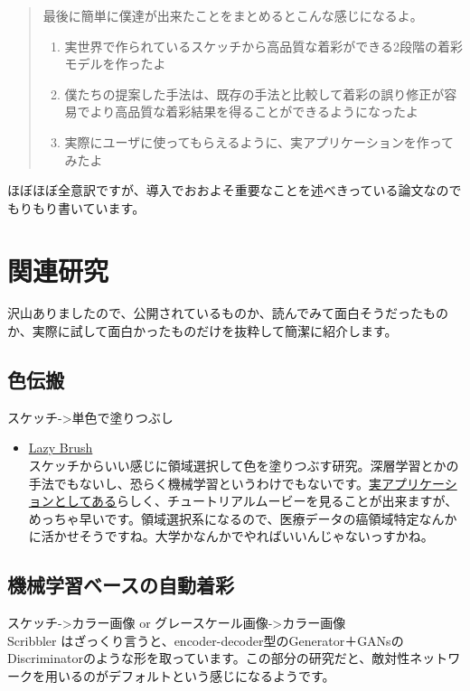 \documentclass[a4paper, dvipdfmx, 10pt]{article}
\begin{document}
\begin{quote}
最後に簡単に僕達が出来たことをまとめるとこんな感じになるよ。\\

\begin{enumerate}
\item 実世界で作られているスケッチから高品質な着彩ができる2段階の着彩モデルを作ったよ\\
\item 僕たちの提案した手法は、既存の手法と比較して着彩の誤り修正が容易でより高品質な着彩結果を得ることができるようになったよ\\
\item 実際にユーザに使ってもらえるように、実アプリケーションを作ってみたよ\\
\end{enumerate}
\end{quote}

ほぼほぼ全意訳ですが、導入でおおよそ重要なことを述べきっている論文なのでもりもり書いています。\\


\section{関連研究}
\label{sec:org2fced56}
沢山ありましたので、公開されているものか、読んでみて面白そうだったものか、実際に試して面白かったものだけを抜粋して簡潔に紹介します。\\

\subsection{色伝搬}
\label{sec:orgf5794f8}
スケッチ->単色で塗りつぶし\\

\begin{itemize}
\item \href{https://dcgi.fel.cvut.cz/home/sykorad/Sykora09-EG.pdf}{Lazy Brush}\\

スケッチからいい感じに領域選択して色を塗りつぶす研究。深層学習とかの手法でもないし、恐らく機械学習というわけでもないです。\href{http://animatetvp.blogspot.com/2015/01/lazybrush.html}{実アプリケーションとしてある}らしく、チュートリアルムービーを見ることが出来ますが、めっちゃ早いです。領域選択系になるので、医療データの癌領域特定なんかに活かせそうですね。大学かなんかでやればいいんじゃないっすかね。\\
\end{itemize}

\subsection{機械学習ベースの自動着彩}
\label{sec:orgf10d670}
スケッチ->カラー画像 or グレースケール画像->カラー画像\\
Scribbler はざっくり言うと、encoder-decoder型のGenerator＋GANsのDiscriminatorのような形を取っています。この部分の研究だと、敵対性ネットワークを用いるのがデフォルトという感じになるようです。\\
\end{document}
